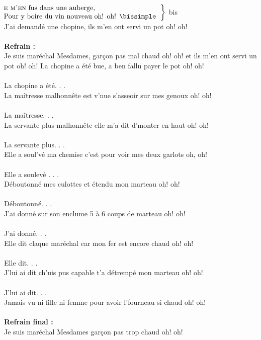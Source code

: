 
~\\
$\left.\begin{tabular}{l}
\hspace{-0.4cm}
\textsc{e m'en} fus dans une auberge,
\\
\hspace{-0.4cm}
Pour y boire du vin nouveau oh! oh! \bissimple
\end{tabular}\right\rbrace$ bis
\\J'ai demandé une chopine, ils m'en ont servi un pot oh! oh!
\\\\\textbf{Refrain :}
\\Je suis maréchal Mesdames, garçon pas mal chaud oh! oh! \bissimple
{}
{et ils m'en ont servi un pot oh! oh!}
La chopine a été bue, a ben fallu payer le pot oh! oh!
\\\\La chopine a été. . . \bissimple
\\La maîtresse malhonnête est v'nue s'asseoir sur mes genoux oh! oh!
\\\\La maîtresse. . . \bissimple
\\La servante plus malhonnête elle m'a dit d'monter en haut oh! oh!
\\\\La servante plus. . . \bissimple
\\Elle a soul'vé ma chemise c'est pour voir mes deux garlots oh, oh!
\\\\Elle a soulevé . . . \bissimple
\\Déboutonné mes culottes et étendu mon marteau oh! oh!
\\\\Déboutonné. . . \bissimple
\\J'ai donné sur son enclume 5 à 6 coups de marteau oh! oh!
\\\\J'ai donné. . . \bissimple
\\Elle dit claque maréchal car mon fer est encore chaud oh! oh!
\\\\Elle dit. . . \bissimple
\\J'lui ai dit ch'uis pus capable t'a détrempé mon marteau oh! oh!
\\\\J'lui ai dit. . . \bissimple
\\Jamais vu ni fille ni femme pour avoir l'fourneau si chaud oh! oh!
\\\\\textbf{Refrain final :}
\\Je suis maréchal Mesdames garçon pas trop chaud oh! oh! \bissimple

\breakpage